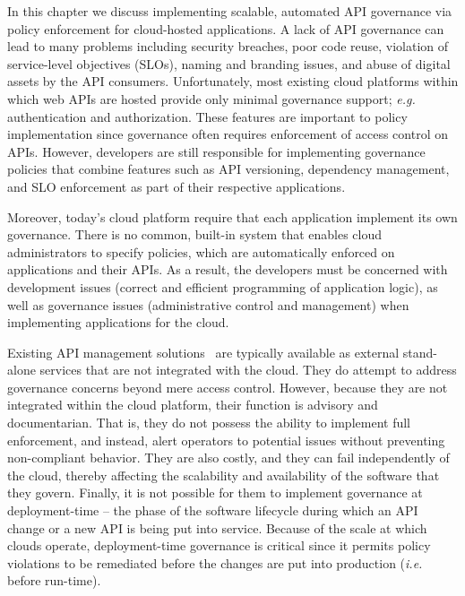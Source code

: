In this chapter we discuss implementing scalable, automated API governance via
policy enforcement for cloud-hosted applications.
A lack of API governance can lead to many problems including security breaches, 
poor code reuse, violation of service-level objectives (SLOs), 
naming and branding issues, and abuse of digital 
assets by the API consumers. Unfortunately, most existing cloud platforms
within which web APIs are hosted provide only minimal governance support; 
{\em e.g.} authentication and authorization.  These features
are important to policy implementation since governance often requires
enforcement of access control on APIs.  
However, developers are still responsible for implementing governance policies
that combine features such as API versioning, 
dependency management, and SLO enforcement as part of their respective
applications.  

Moreover, today's cloud platform require that each application
implement its own governance. There is no common, built-in system that enables
cloud administrators to specify policies, which are automatically enforced on 
applications and their APIs.
As a result, the developers must be concerned with development issues (correct
and efficient programming of application logic), as well as governance issues 
(administrative control and management) when implementing applications for the cloud.

Existing API management solutions~\cite{3scale,apigee,layer7} are typically available as
external stand-alone services that are not integrated with the cloud. They do attempt to
address governance concerns beyond mere access control. However, because they
are not integrated within the cloud platform, their function is
advisory and documentarian.  That is, they 
do not possess the ability to implement full enforcement, and instead, alert
operators to potential issues without preventing non-compliant behavior.
They are also costly, and they can fail independently of the cloud, thereby affecting 
the scalability and availability of the software that they govern.
Finally, it is not possible for them to
implement governance at deployment-time -- the phase of the software lifecycle
during which an API change or a new API is being put into service.
Because of the scale at which clouds operate, deployment-time governance is
critical since it permits policy violations to be remediated before the
changes are put into production ({\em i.e.} before run-time).


